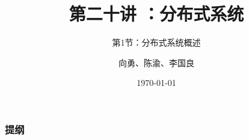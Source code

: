 


\title[第20讲]{第二十讲 ：分布式系统} %
\subtitle{第1节：分布式系统概述}
\author{向勇、陈渝、李国良} %
\date{\today} %


    
    \begin{frame}
        \titlepage %
    \end{frame}
    
    \begin{frame}
        \frametitle{提纲} %
        \tableofcontents %
        
        
    \end{frame}
